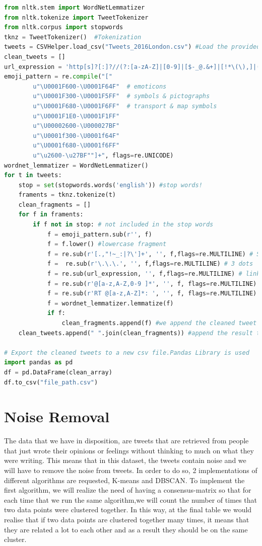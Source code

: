 \documentclass{article}
\begin{document}
         
        \begin{lstlisting}[language=Python, caption= Python Cleaning Function, label={lst:dataCleaning}]
from nltk.stem import WordNetLemmatizer
from nltk.tokenize import TweetTokenizer
from nltk.corpus import stopwords
tknz = TweetTokenizer()  #Tokenization
tweets = CSVHelper.load_csv("Tweets_2016London.csv") #Load the provided CSV file
clean_tweets = [] 
url_expression = 'http[s]?[:]?//(?:[a-zA-Z]|[0-9]|[$-_@.&+]|[!*\(\),]|(?:%[0-9a-fA-F][0-9a-fA-F]))+'
emoji_pattern = re.compile("["
        u"\U0001F600-\U0001F64F"  # emoticons
        u"\U0001F300-\U0001F5FF"  # symbols & pictographs
        u"\U0001F680-\U0001F6FF"  # transport & map symbols
        u"\U0001F1E0-\U0001F1FF" 
        u"\U00002600-\U000027BF"
        u"\U0001f300-\U0001f64F"
        u"\U0001f680-\U0001f6FF"
        u"\u2600-\u27BF""]+", flags=re.UNICODE)
wordnet_lemmatizer = WordNetLemmatizer()
for t in tweets:
    stop = set(stopwords.words('english')) #stop words!
    framents = tknz.tokenize(t)
    clean_fragments = []
    for f in framents:
        if f not in stop: # not included in the stop words
            f = emoji_pattern.sub(r'', f)
            f = f.lower() #lowercase fragment
            f = re.sub(r'[.,"!~_:|?\']+', '', f,flags=re.MULTILINE) # Special characters
            f =  re.sub(r'\.\.\.', '', f,flags=re.MULTILINE) # 3 dots
            f = re.sub(url_expression, '', f,flags=re.MULTILINE) # links
            f = re.sub(r'@[a-z,A-Z,0-9 ]*', '', f, flags=re.MULTILINE) #clean at person references
            f = re.sub(r'RT @[a-z,A-Z]*: ', '', f, flags=re.MULTILINE) #Remove retweets
            f = wordnet_lemmatizer.lemmatize(f)
            if f:
                clean_fragments.append(f) #we append the cleaned tweet to clean_fragment vector
    clean_tweets.append(" ".join(clean_fragments)) #append the result to clean_tweets

# Export the cleaned tweets to a new csv file.Pandas Library is used
import pandas as pd
df = pd.DataFrame(clean_array)
df.to_csv("file_path.csv")
        \end{lstlisting}

        \newpage
        \section{Noise Removal}
The data that we have in disposition, are tweets that are retrieved from people that just wrote their opinions or feelings without thinking to much on what they were writing. This means that in this dataset, the tweets contain noise and we will have to remove the noise from tweets. In order to do so, 2 implementations of different algorithms are requested, K-means and DBSCAN. 
To implement the first algorithm, we will realize the need of having a consensus-matrix so that for each time that we run the same algorithm,we will count the number of times that two data points were clustered together. In this way, at the final table we would realise that if two data points are clustered together many times, it means that they are related a lot to each other and as a result they should be on the same cluster. 
\end{document}
